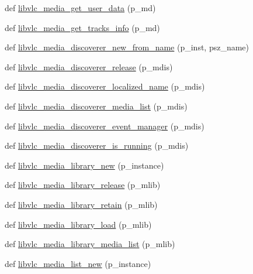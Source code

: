 \begin{DoxyCompactItemize}
\item 
def \hyperlink{namespacesrc_1_1lib_1_1vlc_a92e9f0a068c0e335935a167091e4c555}{libvlc\+\_\+media\+\_\+get\+\_\+user\+\_\+data} (p\+\_\+md)
\item 
def \hyperlink{namespacesrc_1_1lib_1_1vlc_ac71cb132b011cb9f562a7fa2d7c3e67a}{libvlc\+\_\+media\+\_\+get\+\_\+tracks\+\_\+info} (p\+\_\+md)
\item 
def \hyperlink{namespacesrc_1_1lib_1_1vlc_a999f49ceecf75a0b231a5af9f804b1ec}{libvlc\+\_\+media\+\_\+discoverer\+\_\+new\+\_\+from\+\_\+name} (p\+\_\+inst, psz\+\_\+name)
\item 
def \hyperlink{namespacesrc_1_1lib_1_1vlc_a3d2ece07e36fbe386ce963c2ab2cd931}{libvlc\+\_\+media\+\_\+discoverer\+\_\+release} (p\+\_\+mdis)
\item 
def \hyperlink{namespacesrc_1_1lib_1_1vlc_a3efd29bc337e1a6b99e9ffb8eeb65fbe}{libvlc\+\_\+media\+\_\+discoverer\+\_\+localized\+\_\+name} (p\+\_\+mdis)
\item 
def \hyperlink{namespacesrc_1_1lib_1_1vlc_a9f6e701de7d30a8b9491326c6a37086d}{libvlc\+\_\+media\+\_\+discoverer\+\_\+media\+\_\+list} (p\+\_\+mdis)
\item 
def \hyperlink{namespacesrc_1_1lib_1_1vlc_a78ac72e762f23d64b177e141a5c3cfc6}{libvlc\+\_\+media\+\_\+discoverer\+\_\+event\+\_\+manager} (p\+\_\+mdis)
\item 
def \hyperlink{namespacesrc_1_1lib_1_1vlc_aeb292e6e45c61aa21ed55ea20086c0dd}{libvlc\+\_\+media\+\_\+discoverer\+\_\+is\+\_\+running} (p\+\_\+mdis)
\item 
def \hyperlink{namespacesrc_1_1lib_1_1vlc_a6c331cfb500dc7f1f8747f079a70639e}{libvlc\+\_\+media\+\_\+library\+\_\+new} (p\+\_\+instance)
\item 
def \hyperlink{namespacesrc_1_1lib_1_1vlc_a64ceda58e1f2feb3c52a01a8ceefebef}{libvlc\+\_\+media\+\_\+library\+\_\+release} (p\+\_\+mlib)
\item 
def \hyperlink{namespacesrc_1_1lib_1_1vlc_a099d10c53ec91915b1362e500af17245}{libvlc\+\_\+media\+\_\+library\+\_\+retain} (p\+\_\+mlib)
\item 
def \hyperlink{namespacesrc_1_1lib_1_1vlc_a20a1db3955b1d8ef35b3c145bfef0381}{libvlc\+\_\+media\+\_\+library\+\_\+load} (p\+\_\+mlib)
\item 
def \hyperlink{namespacesrc_1_1lib_1_1vlc_abf44f14961f64eaa79260e3c8dcf16a5}{libvlc\+\_\+media\+\_\+library\+\_\+media\+\_\+list} (p\+\_\+mlib)
\item 
def \hyperlink{namespacesrc_1_1lib_1_1vlc_a20e12341792e5af3e30df7608c022b27}{libvlc\+\_\+media\+\_\+list\+\_\+new} (p\+\_\+instance)

\end{DoxyCompactItemize}
